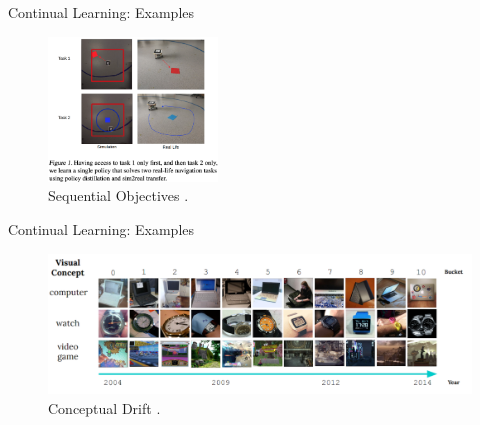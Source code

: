 \documentclass[12pt,aspectratio=169, handout]{beamer}
\begin{document}
\begin{frame}{Continual Learning: Examples}

\begin{figure}
    \centering
    \includegraphics[width=0.4\textwidth]{"images/robot2task.png"}
        \caption{Sequential Objectives \parencite{traore_continual_2019}.}
\end{figure}
    
\end{frame}

\begin{frame}{Continual Learning: Examples}

\begin{figure}
    \begin{center}
        \includegraphics[width=\textwidth]{"images/concept_drift.png"}
        \caption{Conceptual Drift \parencite{jain_instance-conditional_2023}.}
    \end{center}
\end{figure}
    
    
\end{frame}
\end{document}
